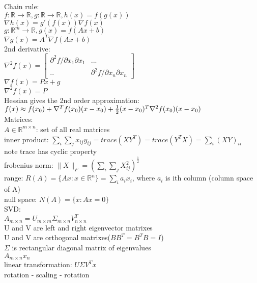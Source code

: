 \documentclass[8pt]{report}
\newcommand{\R}{\mathbb{R}}
\begin{document}
\begin{multicols*}{2}
  Chain rule:\\
  $f: \R \to \R, g: \R \to \R, h(x) = f(g(x))$\\
  $\nabla h(x) = g'(f(x))  \nabla f(x)$\\

  $g:\R^m \to \R, g(x) = f(Ax+b)$\\
  $\nabla g(x) = A^T \nabla f(Ax+b)$\\

  2nd derivative:\\
  $\nabla^2 f(x)=\begin{bmatrix}
    \partial^2 f / \partial x_1 \partial x_1 & ...\\
    .. & \partial^2 f / \partial x_n \partial x_n
  \end{bmatrix}$\\
  $\nabla f(x)=Px+g$\\
  $\nabla^2 f(x)=P$\\

  Hessian gives the 2nd order approximation:\\
  $f(x) \approx f(x_0) + \nabla^T f(x_0)(x-x_0) + \\ \frac{1}{2}(x-x_0)^T \nabla^2 f(x_0) (x-x_0)$\\

  Matrices:\\
  $A \in \R^{m \times n}$: set of all real matrices\\
  inner product: $\sum_i \sum_j x_{ij} y_{ij} = trace(XY^T)=trace(Y^TX)=\sum_{i}(XY)_{ii}$\\
  note trace has cyclic property\\
  frobenius norm: $\|X\|_F  = (\sum_i \sum_j X_{ij}^2)^{\frac{1}{2}}$\\
  range: $R(A) = \{Ax: x \in \R^n\}=\sum_i a_i x_i$, where $a_i$ is ith column (column space of A)\\
  null space: $N(A) = \{ x : Ax = 0\}$\\

  SVD:\\
  $A_{m \times n} = U_{m \times m} \Sigma_{m \times n} V_{n \times n}^T$\\
  U and V are left and right eigenvector matrixes\\
  U and V are orthogonal matrixes($BB^T=B^TB=I$)\\
  $\Sigma$ is rectangular diagonal matrix of eigenvalues\\
  $A_{m \times n}x_{n}$\\
  linear transformation: $U \Sigma V^T x$\\
  rotation - scaling - rotation
  \vfill\null
  \columnbreak
  

\end{multicols*}
\end{document}

